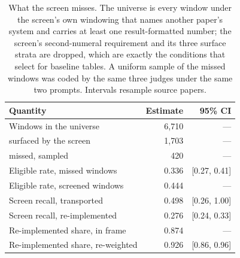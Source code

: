 \begin{table}[t]
\centering\scriptsize
\setlength{\tabcolsep}{3pt}
\begin{tabular}{@{}lrr@{}}
\toprule
Quantity & Estimate & 95\% CI \\
\midrule
Windows in the universe & 6,710 & --- \\
\quad surfaced by the screen & 1,703 & --- \\
\quad missed, sampled & 420 & --- \\
\midrule
Eligible rate, missed windows & 0.336 & [0.27, 0.41] \\
Eligible rate, screened windows & 0.444 & --- \\
\midrule
Screen recall, transported & 0.498 & [0.26, 1.00] \\
Screen recall, re-implemented & 0.276 & [0.24, 0.33] \\
\midrule
Re-implemented share, in frame & 0.874 & --- \\
Re-implemented share, re-weighted & 0.926 & [0.86, 0.96] \\
\bottomrule
\end{tabular}
\caption{What the screen misses. The universe is every window under the screen's own windowing that names another paper's system and carries at least one result-formatted number; the screen's second-numeral requirement and its three surface strata are dropped, which are exactly the conditions that select for baseline tables. A uniform sample of the missed windows was coded by the same three judges under the same two prompts. Intervals resample source papers.}
\label{tab:screen-recall}
\end{table}
